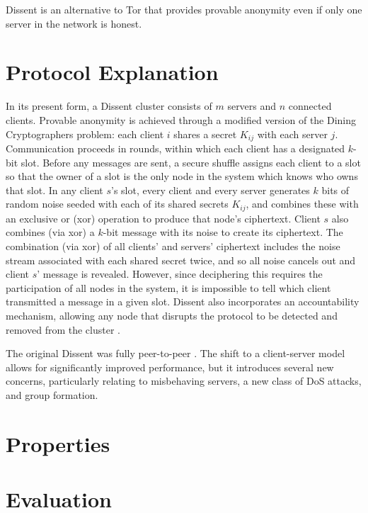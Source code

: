   Dissent is an alternative to Tor that provides provable anonymity even if
  only one server in the network is honest\cite{corrigan-gibbs_dissent:_2010}.
  \section{Protocol Explanation}
  In its present form, a Dissent cluster consists of $m$ servers and $n$
  connected clients\cite{wolinsky_dissent_2012}. Provable anonymity is
  achieved through a modified version of the Dining Cryptographers
  problem\cite{chaum_dining_1988}: each client $i$ shares a secret $K_{ij}$
  with each server $j$. Communication proceeds in rounds, within which each
  client has a designated $k$-bit slot.  Before any messages are sent, a
  secure shuffle\cite{neff_verifiable_2001} assigns each client to a slot so
  that the owner of a slot is the only node in the system which knows who owns
  that slot.  In any client $s$'s slot, every client and every server
  generates $k$ bits of random noise seeded with each of its shared secrets
  $K_{ij}$, and combines these with an exclusive or (xor) operation to produce
  that node's ciphertext. Client $s$ also combines (via xor) a $k$-bit message
  with its noise to create its ciphertext. The combination (via xor) of all
  clients' and servers' ciphertext includes the noise stream associated with
  each shared secret twice, and so all noise cancels out and client $s$'
  message is revealed. However, since deciphering this requires the
  participation of all nodes in the system, it is impossible to tell which
  client transmitted a message in a given slot. Dissent also incorporates an
  accountability mechanism, allowing any node that disrupts the protocol to be
  detected and removed from the cluster
  \cite{corrigan-gibbs_proactively_2013}.

  The original Dissent was fully peer-to-peer
  \cite{corrigan-gibbs_dissent:_2010}. The shift to a client-server model
  allows for significantly improved performance, but it introduces several new
  concerns, particularly relating to misbehaving servers, a new class of DoS
  attacks, and group formation.

  \section{Properties}
  \section{Evaluation}
